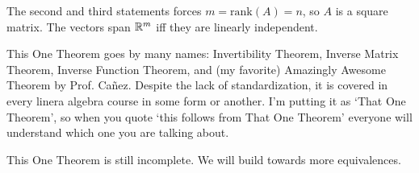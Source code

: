 The second and third statements forces $m=\textrm{rank}(A)=n$, so $A$ is a square matrix. The vectors span $\mathbb{R}^m$ iff they are linearly independent.
\begin{remark}
	This One Theorem goes by many names: Invertibility Theorem, Inverse Matrix Theorem, Inverse Function Theorem, and (my favorite) Amazingly Awesome Theorem by Prof. Ca\~nez.
	Despite the lack of standardization, it is covered in every linera algebra course in some form or another.
	I'm putting it as `That One Theorem', so when you quote `this follows from That One Theorem' everyone will understand which one you are talking about. 
\end{remark}
\begin{remark}
	This One Theorem is still incomplete. We will build towards more equivalences.
\end{remark}
\exercises
